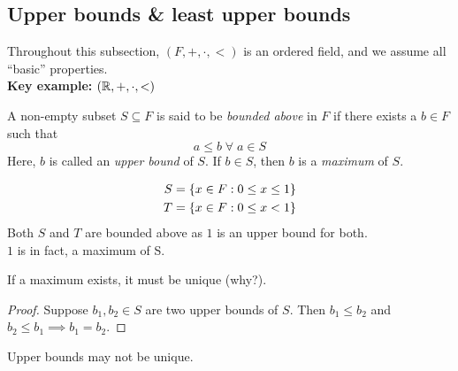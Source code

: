 \documentclass[12pt]{article}
\begin{document}
\subsection{Upper bounds \& least upper bounds}
Throughout this subsection, $(F, +, \cdot, <)$ is an ordered field, and we assume all ``basic'' properties. \\
\textbf{Key example:} $(\mathbb{R}, +, \cdot, <)$

\begin{defn} \label{defn:bounded above}
    A non-empty subset $S \subseteq F$ is said to be \emph{bounded above} in $F$ if there exists a $b \in F$ such that \[
        a \leq b \;\forall\; a \in S
    \]
    Here, $b$ is called an \emph{upper bound} of $S$. If $b \in S$, then $b$ is a \emph{maximum} of $S$.
\end{defn}
\begin{example}
    \begin{align*}
        S &= \set{ x \in F : 0 \leq x \leq 1 } \\
        T &= \set{ x \in F : 0 \leq x < 1 }
    \end{align*}
    Both $S$ and $T$ are bounded above as $1$ is an upper bound for both. \\
    $1$ is in fact, a maximum of S.
\end{example}
\begin{rem}
    If a maximum exists, it must be unique (\textcolor{red!85!black}{why?}).
\end{rem}
\begin{proof}
    Suppose $b_{1}, b_{2} \in S$ are two upper bounds of $S$. Then $b_{1} \leq b_{2}$ and $b_{2} \leq b_{1} \implies b_{1} = b_{2}$.
\end{proof}
\begin{rem}
    Upper bounds may not be unique.
\end{rem}
\end{document}
